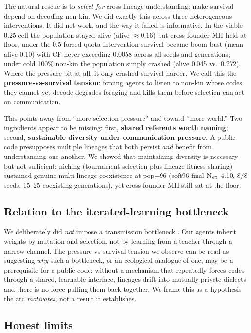 \documentclass[12pt,letterpaper]{article}
\begin{document}
The natural rescue is to \emph{select for} cross-lineage understanding: make survival
depend on decoding non-kin. We did exactly this across three heterogeneous interventions. It
did not work, and the way it failed is informative. In the viable 0.25 cell the population
stayed alive (alive $\approx 0.16$) but cross-founder MII held at floor; under the 0.5
forced-quota intervention survival became boom-bust (mean alive 0.10) with CF never
exceeding 0.0058 across all seeds and generations; under cold 100\% non-kin the population
simply crashed (alive 0.045 vs.\ 0.272). Where the pressure bit at all, it only crashed
survival harder. We call this the \textbf{pressure-vs-survival tension}: forcing agents to
listen to non-kin whose codes they cannot yet decode degrades foraging and kills them before
selection can act on communication.

This points away from ``more selection pressure'' and toward ``more world.'' Two ingredients
appear to be missing: first, \textbf{shared referents worth naming}; second,
\textbf{sustainable diversity under communication pressure}. A public code presupposes
multiple lineages that both persist \emph{and} benefit from understanding one another. We
showed that maintaining diversity is necessary but not sufficient: niching (tournament
selection plus lineage fitness-sharing) sustained genuine multi-lineage coexistence at
pop=96 (soft96 final N$_{\rm eff}$ 4.10, 8/8 seeds, 15--25 coexisting generations), yet
cross-founder MII still sat at the floor.

\subsection{Relation to the iterated-learning bottleneck}

We deliberately did \emph{not} impose a transmission bottleneck \citep{kirby2008}. Our
agents inherit weights by mutation and selection, not by learning from a teacher through a
narrow channel. The pressure-vs-survival tension we observe can be read as suggesting
\emph{why} such a bottleneck, or an ecological analogue of one, may be a prerequisite for
a public code: without a mechanism that repeatedly forces codes through a shared, learnable
interface, lineages drift into mutually private dialects and there is no force pulling them
back together. We frame this as a hypothesis the arc \emph{motivates}, not a result it
establishes.

\subsection{Honest limits}
\end{document}
